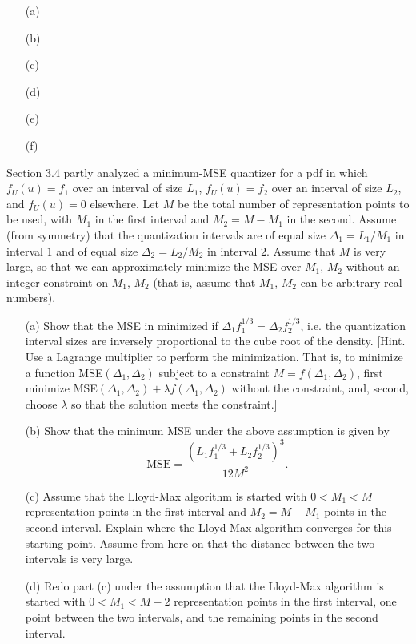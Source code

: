 \documentclass{assignment}
\begin{document}
\begin{sol}
    \begin{itemize}
        \item[(a)] 
        \item[(b)] 
        \item[(c)] 
        \item[(d)] 
        \item[(e)] 
        \item[(f)] 
    \end{itemize}
\end{sol}

\begin{prob}[3.4]
    Section 3.4 partly analyzed a minimum-MSE quantizer for a pdf in which $f_U(u)=f_1$ over an interval of size $L_1$, $f_U(u)=f_2$ over an interval of size $L_2$, and $f_U(u)=0$ elsewhere. Let $M$ be the total number of representation points to be used, with $M_1$ in the first interval and $M_2=M-M_1$ in the second. Assume (from symmetry) that the quantization intervals are of equal size $\Delta_1=L_1/M_1$ in interval $1$ and of equal size $\Delta_2=L_2/M_2$ in interval $2$. Assume that $M$ is very large, so that we can approximately minimize the MSE over $M_1$, $M_2$ without an integer constraint on $M_1$, $M_2$ (that is, assume that $M_1$, $M_2$ can be arbitrary real numbers).
    \begin{itemize}
        \item[(a)] Show that the MSE in minimized if $\Delta_1f_1^{1/3}=\Delta_2f_2^{1/3}$, i.e. the quantization interval sizes are inversely proportional to the cube root of the density. [Hint. Use a Lagrange multiplier to perform the minimization. That is, to minimize a function MSE$(\Delta_1,\Delta_2)$ subject to a constraint $M=f(\Delta_1,\Delta_2)$, first minimize MSE$(\Delta_1,\Delta_2)+\lambda f(\Delta_1,\Delta_2)$ without the constraint, and, second, choose $\lambda$ so that the solution meets the constraint.]
        \item[(b)] Show that the minimum MSE under the above assumption is given by
        \[
            \text{MSE}=\frac{(L_1f_1^{1/3}+L_2f_2^{1/3})^3}{12M^2}.
        \]
        \item[(c)] Assume that the Lloyd-Max algorithm is started with $0<M_1<M$ representation points in the first interval and $M_2=M-M_1$ points in the second interval. Explain where the Lloyd-Max algorithm converges for this starting point. Assume from here on that the distance between the two intervals is very large.
        \item[(d)] Redo part (c) under the assumption that the Lloyd-Max algorithm is started with $0<M_1<M-2$ representation points in the first interval, one point between the two intervals, and the remaining points in the second interval.

\end{itemize}
\end{prob}
\end{document}
